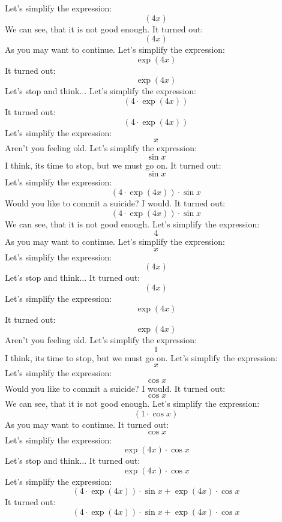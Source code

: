 \documentclass[12pt,a4paper]{scrartcl}
\begin{document}
Let's simplify the expression: $$ \left( 4x \right) $$ We can see, that it is not good enough. 
It turned out: $$ \left( 4x \right) $$ As you may want to continue. 
Let's simplify the expression: $$ \exp{  \left( 4x \right)  } $$  
It turned out: $$ \exp{  \left( 4x \right)  } $$ Let's stop and think... 
Let's simplify the expression: $$ \left( 4 \cdot  \exp{  \left( 4x \right)  }  \right) $$  
It turned out: $$ \left( 4 \cdot  \exp{  \left( 4x \right)  }  \right) $$  
Let's simplify the expression: $$x$$ Aren't you feeling old. 
Let's simplify the expression: $$ \sin x$$ I think, its time to stop, but we must go on. 
It turned out: $$ \sin x$$  
Let's simplify the expression: $$ \left( 4 \cdot  \exp{  \left( 4x \right)  }  \right)  \cdot  \sin x$$ Would you like to commit a suicide? I would. 
It turned out: $$ \left( 4 \cdot  \exp{  \left( 4x \right)  }  \right)  \cdot  \sin x$$ We can see, that it is not good enough. 
Let's simplify the expression: $$4$$ As you may want to continue. 
Let's simplify the expression: $$x$$  
Let's simplify the expression: $$ \left( 4x \right) $$ Let's stop and think... 
It turned out: $$ \left( 4x \right) $$  
Let's simplify the expression: $$ \exp{  \left( 4x \right)  } $$  
It turned out: $$ \exp{  \left( 4x \right)  } $$ Aren't you feeling old. 
Let's simplify the expression: $$1$$ I think, its time to stop, but we must go on. 
Let's simplify the expression: $$x$$  
Let's simplify the expression: $$ \cos x$$ Would you like to commit a suicide? I would. 
It turned out: $$ \cos x$$ We can see, that it is not good enough. 
Let's simplify the expression: $$ \left( 1 \cdot  \cos x \right) $$ As you may want to continue. 
It turned out: $$ \cos x$$  
Let's simplify the expression: $$ \exp{  \left( 4x \right)  }  \cdot  \cos x$$ Let's stop and think... 
It turned out: $$ \exp{  \left( 4x \right)  }  \cdot  \cos x$$  
Let's simplify the expression: $$ \left( 4 \cdot  \exp{  \left( 4x \right)  }  \right)  \cdot  \sin x+ \exp{  \left( 4x \right)  }  \cdot  \cos x$$  
It turned out: $$ \left( 4 \cdot  \exp{  \left( 4x \right)  }  \right)  \cdot  \sin x+ \exp{  \left( 4x \right)  }  \cdot  \cos x
 $$ 
 
\end{document}
